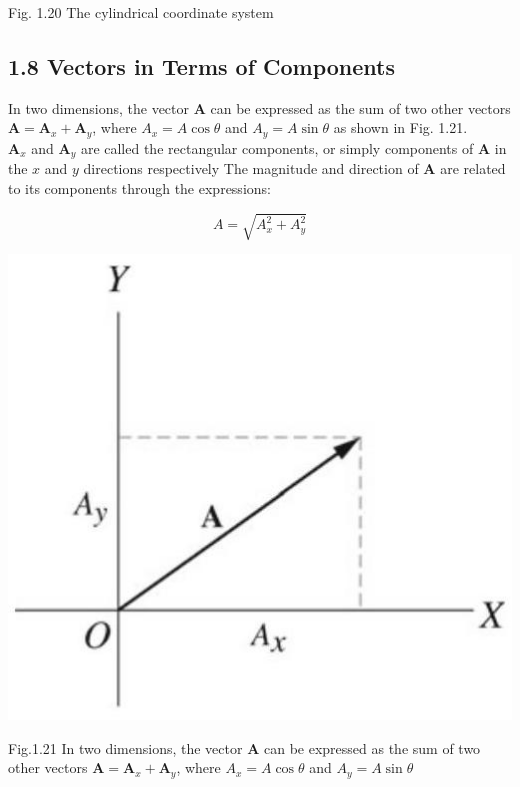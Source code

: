 \documentclass[10pt]{article}
\begin{document}
Fig. 1.20 The cylindrical coordinate system

\subsection*{1.8 Vectors in Terms of Components}
In two dimensions, the vector $\mathbf{A}$ can be expressed as the sum of two other vectors $\mathbf{A}=\mathbf{A}_{x}+\mathbf{A}_{y}$, where $A_{x}=A \cos \theta$ and $A_{y}=A \sin \theta$ as shown in Fig. 1.21.\\
$\mathbf{A}_{x}$ and $\mathbf{A}_{y}$ are called the rectangular components, or simply components of $\mathbf{A}$ in the $x$ and $y$ directions respectively The magnitude and direction of $\mathbf{A}$ are related to its components through the expressions:

$$
A=\sqrt{A_{x}^{2}+A_{y}^{2}}
$$

\begin{center}
\includegraphics[max width=\textwidth]{2024_09_13_db1f357d2aad0a03eb2eg-018(2)}
\end{center}

Fig.1.21 In two dimensions, the vector $\mathbf{A}$ can be expressed as the sum of two other vectors $\mathbf{A}=\mathbf{A}_{x}+\mathbf{A}_{y}$, where $A_{x}=A \cos \theta$ and $A_{y}=A \sin \theta$
\end{document}
